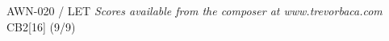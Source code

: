 \documentclass[11pt]{report}
\begin{document}
\null \vfill

AWN-020 / LET \hfill
\textit{Scores available from the composer at www.trevorbaca.com}
\hfill CB2[16] (9/9)
\end{document}
